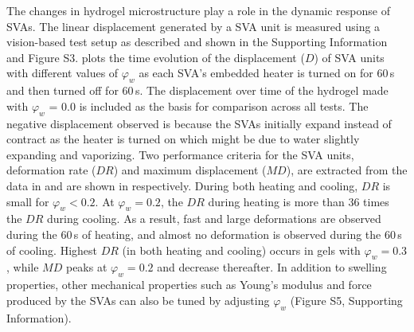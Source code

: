 The changes in hydrogel microstructure play a role in the dynamic response of SVAs. The linear displacement generated by a SVA unit
is measured using a vision-based test setup as described and shown in the Supporting Information and Figure S3.  plots the time evolution of the displacement ($D$) of SVA units with different values of $\varphi_w$ 
as each SVA's embedded heater is turned on for 60\,s 
and then turned off for 60\,s. The displacement over time of the hydrogel made with \(\varphi_{w}\) = 0.0 is included as the basis for comparison across all tests. The negative displacement observed is because the SVAs initially expand instead of contract as the heater is turned on which might be due to water slightly expanding and vaporizing. Two performance criteria for the SVA units, deformation rate ($DR$) and maximum displacement ($MD$), are extracted from the data in  and are shown in  respectively. During both heating and cooling, $DR$ is small for \(\varphi_{w} < 0.2\). At \(\varphi_{w} = 0.2\), the $DR$ during heating is more than 36 times the $DR$ during cooling. As a result, fast and large deformations are observed during the 60\,s of heating, and almost no deformation is observed during the 60\,s of cooling. 
Highest $DR$ (in both heating and cooling) occurs in gels with $\varphi_w = 0.3$, while $MD$ peaks at $\varphi_w = 0.2$ and decrease thereafter.
In addition to swelling properties, other mechanical properties such as Young's modulus and force produced by the SVAs can also be tuned by adjusting \(\varphi_{w}\) (Figure S5, Supporting Information).\\ 

